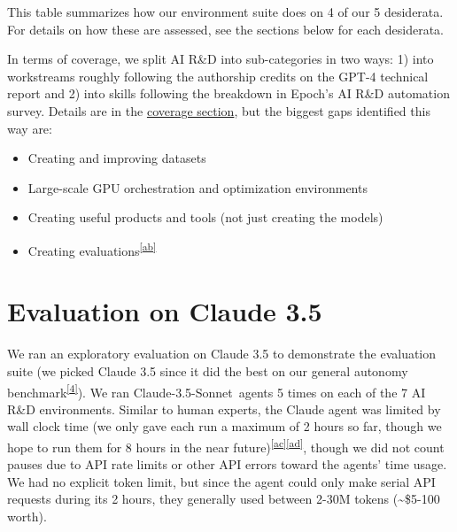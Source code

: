 \documentclass[
]{article}
\providecommand{\tightlist}{%
  \setlength{\itemsep}{0pt}\setlength{\parskip}{0pt}}
\begin{document}
{}

{This table summarizes how our environment suite does on 4 of our 5
desiderata. For details on how these are assessed, see the sections
below for each desiderata.}

{}

{In terms of coverage, we split AI R\&D into sub-categories in two ways:
1) into workstreams roughly following the authorship credits on the
GPT-4 technical report and 2) into skills following the breakdown in
Epoch's AI R\&D automation survey. Details are in the
}{\hyperref[h.qt7srnrx8j84]{coverage section}}{, but the biggest gaps
identified this way are:}

\begin{itemize}
\tightlist
\item
  {Creating and improving datasets}
\item
  {Large-scale GPU orchestration and optimization environments}
\item
  {Creating useful products and tools (not just creating the models)}
\item
  {Creating
  evaluations}\textsuperscript{\label{cmnt_ref28}\hyperref[cmnt28]{{[}ab{]}}}
\end{itemize}

\section{\texorpdfstring{{Evaluation on Claude
3.5}}{Evaluation on Claude 3.5}}\label{h.ehpuwb9fgkyi}

{We ran an exploratory evaluation on Claude 3.5 to demonstrate the
evaluation suite (we picked Claude 3.5 since it did the best on our
general autonomy
benchmark}\textsuperscript{\label{ftnt_ref4}\hyperref[ftnt4]{{[}4{]}}}{).
We ran }{Claude-3.5-Sonnet}{~agents 5 times on each of the 7 AI R\&D
environments. }{Similar to human experts, the Claude agent was limited
by wall clock time (we only gave each run a maximum of 2 hours so far,
though we hope to run them for 8 hours in the near
future)}\textsuperscript{\label{cmnt_ref29}\hyperref[cmnt29]{{[}ac{]}}\label{cmnt_ref30}\hyperref[cmnt30]{{[}ad{]}}}{,
though we did not count pauses due to API rate limits or other API
errors toward the agents' time usage. We had no explicit token limit,
but since the agent could only make serial API requests during its 2
hours, they generally used between 2-30M tokens (\textasciitilde\$5-100
worth). }

{}
\end{document}
